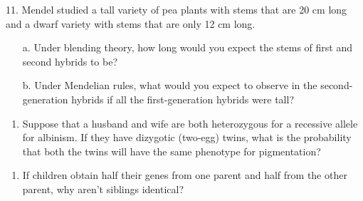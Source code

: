 \documentclass[11pt,]{article}
\providecommand{\tightlist}{%
  \setlength{\itemsep}{0pt}\setlength{\parskip}{0pt}}
\begin{document}
\begin{blackbox}

11. Mendel studied a tall variety of pea plants with stems that are 20 cm long and a dwarf variety with stems that are only 12 cm long. \begin{enumerate} 
 \item[a.]{ Under blending theory, how long would you expect the stems of first and second hybrids to be? } 
 \item[b.]{ Under Mendelian rules, what would you expect to observe in the second-generation hybrids if all the first-generation hybrids were tall? } 
 \end{enumerate}

\vspace{19cm}


\end{blackbox}

\begin{blackbox}

\begin{enumerate}
\def\labelenumi{\arabic{enumi}.}
\setcounter{enumi}{45}
\tightlist
\item
  Suppose that a husband and wife are both heterozygous for a recessive
  allele for albinism. If they have dizygotic (two-egg) twins, what is
  the probability that both the twins will have the same phenotype for
  pigmentation?
\end{enumerate}

\vspace{20cm}

\end{blackbox}

\begin{blackbox}

\begin{enumerate}
\def\labelenumi{\arabic{enumi}.}
\setcounter{enumi}{26}
\tightlist
\item
  If children obtain half their genes from one parent and half from the
  other parent, why aren't siblings identical?
\end{enumerate}

\vspace{19cm}

\end{blackbox}
\end{document}
